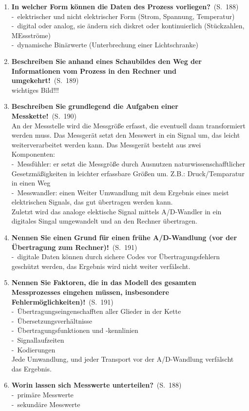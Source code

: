 \documentclass[a4paper,12pt]{article}
\newcommand{\question}[3]{\pagebreak[3]\item {\textbf{#1?}}\ (S.\ #2)#3}
\newcommand{\statement}[3]{\pagebreak[3]\item {\textbf{#1!}}\ (S.\ #2)#3}
\newcommand{\catchword}[1]{\\-\ #1}
\newcommand{\normaltext}[1]{\\#1}
\newcommand{\page}[1]{#1}
\begin{document}
\begin{enumerate}
  \question{In welcher Form können die Daten des Prozess vorliegen}{\page{188}}
  {
    \catchword{elektrischer und nicht elektrischer Form (Strom, Spannung, Temperatur)}
    \catchword{digital oder analog, sie ändern sich diskret oder kontinuierlich (Stückzahlen, MEssströme)}
    \catchword{dynamische Binärwerte (Unterbrechung einer Lichtschranke)}
  }

  \statement{Beschreiben Sie anhand eines Schaubildes den Weg der Informationen
             vom Prozess in den Rechner und umgekehrt}{\page{189}}
  {
    \normaltext{wichtiges Bild!!!}
  }

  \statement{Beschreiben Sie grundlegend die Aufgaben einer Messkette}{\page{190}}
  {
    \normaltext{An der Messstelle wird die Messgröße erfasst, die eventuell dann 
              transformiert werden muss. Das Messgerät setzt den Messwert in ein Signal
              um, das leicht weiterverarbeitet werden kann. Das Messgerät besteht
              aus zwei Komponenten:}
    \catchword{Messfühler: er setzt die Messgröße durch Ausnutzen naturwissenschafftlicher
             Gesetzmäßigkeiten in leichter erfassbare Größen um. Z.B.: Druck/Temparatur in einen Weg} 
    \catchword{Messwandler: einen Weiter Umwandlung mit dem Ergebnis eines meist elektrischen
               Signals, das gut übertragen werden kann.}
    \normaltext{Zuletzt wird das analoge elektische Signal mittels A/D-Wandler in ein digitales
                Singal umgewandelt und an den Rechner übertragen.}
  }

  \statement{Nennen Sie einen Grund für einen frühe A/D-Wandlung (vor der Übertragung zum Rechner)}{\page{191}} 
  {
    \catchword{digitale Daten können durch sichere Codes vor Übertragungsfehlern geschützt werden,
               das Ergebnis wird nicht weiter verfälscht.} 
  }

  \statement{Nennen Sie Faktoren, die in das Modell des gesamten Messprozesses eingehen müssen,
             insbesondere Fehlermöglichkeiten)}{\page{191}} 
  {
    \catchword{Übertragungseingenschafften aller Glieder in der Kette} 
    \catchword{Übersetzungsverhältnisse} 
    \catchword{Übertragungsfunktionen und -kennlinien} 
    \catchword{Signallaufzeiten} 
    \catchword{Kodierungen}
    \normaltext{Jede Umwandlung, und jeder Transport vor der A/D-Wandlung verfälscht das Ergebnis.}
  }
  
   \question{Worin lassen sich Messwerte unterteilen}{\page{188}}
  {
    \catchword{primäre Messwerte}
    \catchword{sekundäre Messwerte}
  }
  

\end{enumerate}
\end{document}
